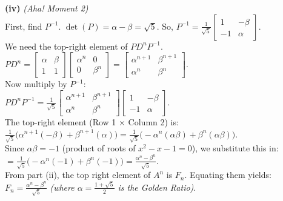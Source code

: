 \begin{solution}
\medskip
\textbf{(iv)} \textit{(Aha! Moment 2)} \\
First, find $P^{-1}$. $\det(P) = \alpha - \beta = \sqrt{5}$. So, $P^{-1} = \frac{1}{\sqrt{5}} \begin{bmatrix} 1 & -\beta \\ -1 & \alpha \end{bmatrix}$. \\
We need the top-right element of $P D^n P^{-1}$. \\
$P D^n = \begin{bmatrix} \alpha & \beta \\ 1 & 1 \end{bmatrix} \begin{bmatrix} \alpha^n & 0 \\ 0 & \beta^n \end{bmatrix} = \begin{bmatrix} \alpha^{n+1} & \beta^{n+1} \\ \alpha^n & \beta^n \end{bmatrix}$. \\
Now multiply by $P^{-1}$: \\
$P D^n P^{-1} = \frac{1}{\sqrt{5}} \begin{bmatrix} \alpha^{n+1} & \beta^{n+1} \\ \alpha^n & \beta^n \end{bmatrix} \begin{bmatrix} 1 & -\beta \\ -1 & \alpha \end{bmatrix}$. \\
The top-right element (Row 1 $\times$ Column 2) is: \\
$\frac{1}{\sqrt{5}} \big( \alpha^{n+1}(-\beta) + \beta^{n+1}(\alpha) \big) = \frac{1}{\sqrt{5}} \big( -\alpha^n(\alpha\beta) + \beta^n(\alpha\beta) \big)$. \\
Since $\alpha\beta = -1$ (product of roots of $x^2-x-1=0$), we substitute this in: \\
$= \frac{1}{\sqrt{5}} \big( -\alpha^n(-1) + \beta^n(-1) \big) = \frac{\alpha^n - \beta^n}{\sqrt{5}}$. \\
From part (ii), the top right element of $A^n$ is $F_n$. Equating them yields: \\
\textbf{$F_n = \frac{\alpha^n - \beta^n}{\sqrt{5}}$} \textit{(where $\alpha = \frac{1+\sqrt{5}}{2}$ is the Golden Ratio)}.
\end{solution}

